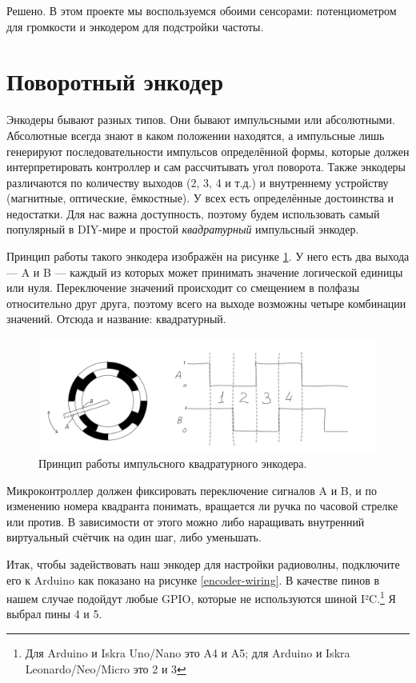 Решено. В этом проекте мы воспользуемся обоими сенсорами: потенциометром для громкости и энкодером для подстройки частоты.

\section{Поворотный энкодер}

Энкодеры бывают разных типов. Они бывают импульсными или абсолютными. Абсолютные всегда знают в каком положении находятся, а импульсные лишь генерируют последовательности импульсов определённой формы, которые должен интерпретировать контроллер и сам рассчитывать угол поворота. Также энкодеры различаются по количеству выходов (2, 3, 4 и т.д.) и внутреннему устройству (магнитные, оптические, ёмкостные). У всех есть определённые достоинства и недостатки. Для нас важна доступность, поэтому будем использовать самый популярный в DIY-мире и простой \emph{квадратурный} импульсный энкодер.

Принцип работы такого энкодера изображён на рисунке \ref{fig:quadrature-encoder}. У него есть два выхода — A и B — каждый из которых может принимать значение логической единицы или нуля. Переключение значений происходит со смещением в полфазы относительно друг друга, поэтому всего на выходе возможны четыре комбинации значений. Отсюда и название: квадратурный.

\begin{figure}
  \centering
  \includegraphics{sketches/quadrature-encoder-internals}
  \caption{Принцип работы импульсного квадратурного энкодера.}
  \label{fig:quadrature-encoder}
\end{figure}

Микроконтроллер должен фиксировать переключение сигналов A и B, и по изменению номера квадранта понимать, вращается ли ручка по часовой стрелке или против. В зависимости от этого можно либо наращивать внутренний виртуальный счётчик на один шаг, либо уменьшать.

Итак, чтобы задействовать наш энкодер для настройки радиоволны, подключите его к Arduino как показано на рисунке \ref{encoder-wiring}. В качестве пинов в нашем случае подойдут любые GPIO, которые не используются шиной I²C.\footnote{Для Arduino и Iskra Uno/Nano это A4 и A5; для Arduino и Iskra Leonardo/Neo/Micro это 2 и 3} Я выбрал пины 4 и 5.

